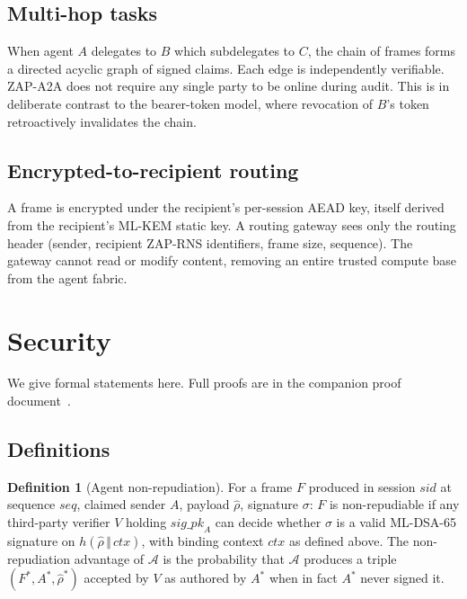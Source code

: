 \documentclass[11pt,a4paper]{article}
\theoremstyle{definition}
\newtheorem{definition}[theorem]{Definition}
\theoremstyle{remark}
\newcommand{\zapaa}{\textsf{ZAP-A2A}\xspace}
\newcommand{\rns}{\textsf{ZAP-RNS}\xspace}
\begin{document}
\subsection{Multi-hop tasks}

When agent $A$ delegates to $B$ which subdelegates to $C$, the
chain of frames forms a directed acyclic graph of signed claims. Each
edge is independently verifiable. \zapaa{} does not require any single
party to be online during audit. This is in deliberate contrast to
the bearer-token model, where revocation of $B$'s token retroactively
invalidates the chain.

\subsection{Encrypted-to-recipient routing}

A frame is encrypted under the recipient's per-session AEAD key,
itself derived from the recipient's ML-KEM static key. A routing
gateway sees only the routing header (sender, recipient \rns{}
identifiers, frame size, sequence). The gateway cannot read or modify
content, removing an entire trusted compute base from the agent
fabric.

\section{Security}\label{sec:security}

We give formal statements here. Full proofs are in the companion
proof document~\cite{proof}.

\subsection{Definitions}

\begin{definition}[Agent non-repudiation]
For a frame $F$ produced in session $\mathit{sid}$ at sequence
$\mathit{seq}$, claimed sender $A$, payload $\hat{\rho}$, signature
$\sigma$: $F$ is non-repudiable if any third-party verifier $V$ holding
$\mathit{sig\_pk}_A$ can decide whether $\sigma$ is a valid ML-DSA-65
signature on $h(\hat{\rho}\,\Vert\,\mathit{ctx})$, with binding context
$\mathit{ctx}$ as defined above. The non-repudiation advantage of
$\mathcal{A}$ is the probability that $\mathcal{A}$ produces a triple
$(F^*, A^*, \hat{\rho}^*)$ accepted by $V$ as authored by $A^*$ when in
fact $A^*$ never signed it.
\end{definition}
\end{document}
